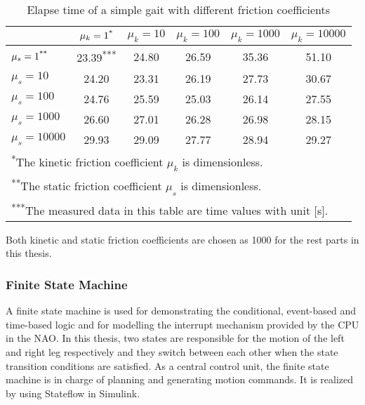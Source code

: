 \begin{table}[H]
	\centering
	\caption{Elapse time of a simple gait with different friction coefficients}
	\label{simplegaitsimtimetable}
	\begin{tabular}{lccccc}
		\hline
		&$\mu_k = 1\textsuperscript{*}$&$\mu_k = 10$&$\mu_k = 100$&$\mu_k = 1000$&$ \mu_k = 10000 $\\
		\hline
		$ \mu_s = 1\textsuperscript{**} $&23.39\textsuperscript{***}&24.80&26.59&35.36&51.10\\
		\hline
		$ \mu_s = 10 $&24.20&23.31&26.19&27.73&30.67\\
		\hline
		$ \mu_s = 100 $&24.76&25.59&25.03&26.14&27.55\\
		\hline
		$ \mu_s = 1000 $&26.60&27.01&26.28&\cellcolor{mygreen}26.98&28.15\\
		\hline
		$ \mu_s = 10000 $&29.93&29.09&27.77&28.94&29.27\\
		\hline
		\multicolumn{6}{l}{\textsuperscript{*}\footnotesize{The kinetic friction coefficient $ \mu_k $ is dimensionless.}}\\
		\multicolumn{6}{l}{\textsuperscript{**}\footnotesize{The static friction coefficient $ \mu_s $ is dimensionless.}}\\
		\multicolumn{6}{l}{\textsuperscript{***}\footnotesize{The measured data in this table are time values with unit [\si{\second}].}}
	\end{tabular}
\end{table}

Both kinetic and static friction coefficients are chosen as 1000 for the rest parts in this thesis.


\subsubsection{Finite State Machine}
A finite state machine is used for demonstrating the conditional, event-based and time-based logic and for modelling the interrupt mechanism provided by the CPU in the NAO. In this thesis, two states are responsible for the motion of the left and right leg respectively and they switch between each other when the state transition conditions are satisfied. As a central control unit, the finite state machine is in charge of planning and generating motion commands. It is realized by using Stateflow in Simulink.



